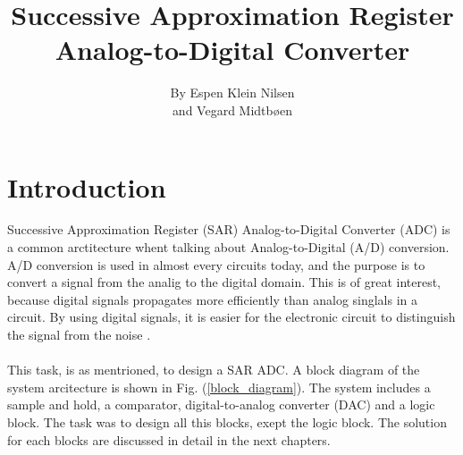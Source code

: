 \documentclass[english, 12pt, a4paper]{ifimaster}
\title{ \huge{Successive Approximation Register Analog-to-Digital Converter}}
\author{By Espen Klein Nilsen\\ and Vegard Midtbøen}
\begin{document}
\ififorside{}
\maketitle{} \newpage

\tableofcontents{} \newpage
\listoffigures{} 
\listoftables{} \newpage



\chapter{Introduction} 
Successive Approximation Register (SAR) Analog-to-Digital Converter (ADC) is a common arctitecture whent talking about Analog-to-Digital (A/D) conversion. A/D conversion is used in almost every
circuits today, and the purpose is to convert a signal from the analig to the digital domain. This is of great interest, because digital signals propagates more efficiently than analog singlals in a 
circuit. By using digital signals, it is easier for the electronic circuit to distinguish the signal from the noise \cite{basic-adc}.\\
\\
This task, is as mentrioned, to design a SAR ADC. A block diagram of the system arcitecture is shown in Fig. (\ref{block_diagram}). The system includes a sample and hold, a comparator, digital-to-analog 
converter (DAC) and a logic block. The task was to design all this blocks, exept the logic block. The solution for each blocks are discussed in detail in the next chapters.  
\end{document}
